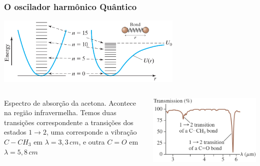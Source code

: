 \documentclass[12pt,brazil,table]{beamer}
\begin{document}
\begin{frame}
  \frametitle{O oscilador harmônico Quântico}
    \vspace{-0.25cm}
    \begin{minipage}[t][20ex][t]{\linewidth}
      \begin{center}
        \includegraphics[height=3.25cm]{figuras/fig28}
      \end{center}
    \end{minipage}
    
    \vspace*{-1.5cm}
    \begin{minipage}[b][20ex][t]{\linewidth}
      \begin{columns}
        \fontsize{9pt}{11pt}\selectfont
        
        \vspace*{1.cm}        
        \begin{minipage}{\linewidth}
          Espectro de absorção da acetona. Acontece na região infravermelha. Temos duas transições correspondente a transições dos estados $1\to 2$, uma corresponde a vibração $C-CH_3$ em $\lambda = 3,3\,cm$, e outra $C=O$ em $\lambda = 5,8\,cm$
        \end{minipage}
          \begin{center}
            \hspace*{-0.25cm}\includegraphics[height=4.cm]{figuras/fig29}
          \end{center}
      \end{columns}

    \end{minipage}

\end{frame}
\end{document}
